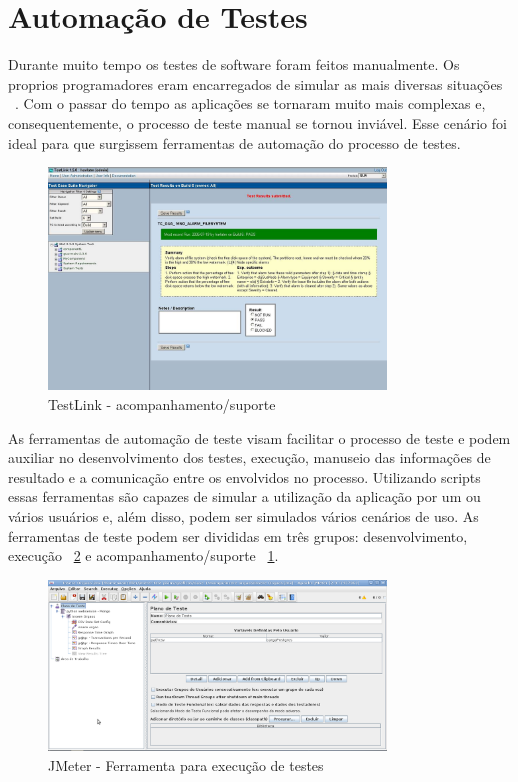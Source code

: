 \section{Automação de Testes}

Durante muito tempo os testes de software foram feitos manualmente. Os proprios programadores eram encarregados de simular as mais diversas situações ~\cite{rios2006teste}. Com o passar do tempo as aplicações se tornaram muito mais complexas e, consequentemente, o processo de teste manual se tornou inviável. Esse cenário foi ideal para que surgissem ferramentas de automação do processo de testes.

	\begin{figure}[!htbp]
		\begin{center}
			\includegraphics[width=0.8\textwidth]{testlink}
		\end{center}
		\caption{TestLink - acompanhamento/suporte ~\cite{siteTestLink}}
		\label{fig:testlink}
	\end{figure}

As ferramentas de automação de teste visam facilitar o processo de teste e podem auxiliar no desenvolvimento dos testes, execução, manuseio das informações de resultado e a comunicação entre os envolvidos no processo. Utilizando scripts essas ferramentas são capazes de simular a utilização da aplicação por um ou vários usuários e, além disso, podem ser simulados vários cenários de uso. As ferramentas de teste podem ser divididas em três grupos: desenvolvimento, execução ~\ref{fig:jmeter} e acompanhamento/suporte ~\ref{fig:testlink}.

	\begin{figure}[!htbp]
		\begin{center}
			\includegraphics[width=0.8\textwidth]{jmeter}
		\end{center}
		\caption{JMeter - Ferramenta para execução de testes ~\cite{siteJmeter}}
		\label{fig:jmeter}
	\end{figure}


